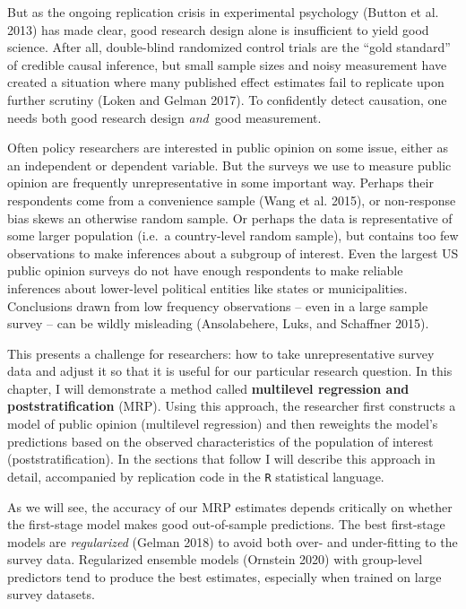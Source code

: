 \documentclass[
]{article}
\begin{document}
But as the ongoing replication crisis in experimental psychology (Button
et al. 2013) has made clear, good research design alone is insufficient
to yield good science. After all, double-blind randomized control trials
are the ``gold standard'' of credible causal inference, but small sample
sizes and noisy measurement have created a situation where many
published effect estimates fail to replicate upon further scrutiny
(Loken and Gelman 2017). To confidently detect causation, one needs both
good research design \emph{and}~good measurement.

Often policy researchers are interested in public opinion on some issue,
either as an independent or dependent variable. But the surveys we use
to measure public opinion are frequently unrepresentative in some
important way. Perhaps their respondents come from a convenience sample
(Wang et al. 2015), or non-response bias skews an otherwise random
sample. Or perhaps the data is representative of some larger population
(i.e.~a country-level random sample), but contains too few observations
to make inferences about a subgroup of interest. Even the largest US
public opinion surveys do not have enough respondents to make reliable
inferences about lower-level political entities like states or
municipalities. Conclusions drawn from low frequency observations --
even in a large sample survey -- can be wildly misleading (Ansolabehere,
Luks, and Schaffner 2015).

This presents a challenge for researchers: how to take unrepresentative
survey data and adjust it so that it is useful for our particular
research question. In this chapter, I will demonstrate a method called
\textbf{multilevel regression and poststratification} (MRP). Using this
approach, the researcher first constructs a model of public opinion
(multilevel regression) and then reweights the model's predictions based
on the observed characteristics of the population of interest
(poststratification). In the sections that follow I will describe this
approach in detail, accompanied by replication code in the \texttt{R}
statistical language.

As we will see, the accuracy of our MRP estimates depends critically on
whether the first-stage model makes good out-of-sample predictions. The
best first-stage models are \emph{regularized} (Gelman 2018) to avoid
both over- and under-fitting to the survey data. Regularized ensemble
models (Ornstein 2020) with group-level predictors tend to produce the
best estimates, especially when trained on large survey datasets.
\end{document}
